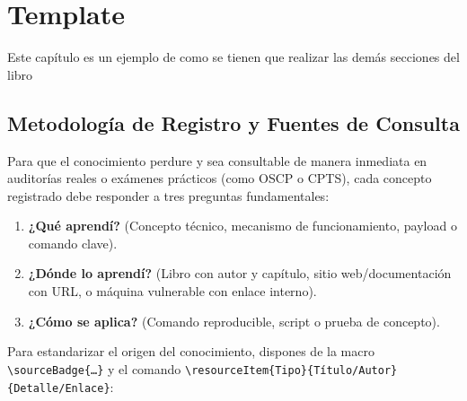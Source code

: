 
\section{Template}
\label{chap:template}

Este capítulo es un ejemplo de como se tienen que realizar las demás secciones del libro
\subsection{Metodología de Registro y Fuentes de Consulta}
Para que el conocimiento perdure y sea consultable de manera inmediata en auditorías reales o exámenes prácticos (como OSCP o CPTS), cada concepto registrado debe responder a tres preguntas fundamentales:
\begin{enumerate}
	\item \textbf{¿Qué aprendí?} (Concepto técnico, mecanismo de funcionamiento, payload o comando clave).
	\item \textbf{¿Dónde lo aprendí?} (Libro con autor y capítulo, sitio web/documentación con URL, o máquina vulnerable con enlace interno).
	\item \textbf{¿Cómo se aplica?} (Comando reproducible, script o prueba de concepto).
\end{enumerate}

\begin{infobox}
	Para estandarizar el origen del conocimiento, dispones de la macro \texttt{\textbackslash sourceBadge\{\ldots\}} y el comando \texttt{\textbackslash resourceItem\{Tipo\}\{Título/Autor\}\{Detalle/Enlace\}}:
	\begin{center}
		\small
		 \hspace{4pt}
		 \hspace{4pt}
		 \hspace{4pt}
		 \hspace{4pt}
		 \hspace{4pt}
		 \hspace{4pt}
		 \hspace{4pt}
	\end{center}
\end{infobox}


